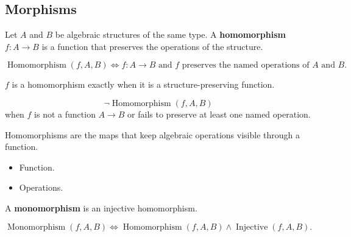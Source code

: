 \subsection{Morphisms}
\label{subsec:morphisms}

\begin{tcolorbox}[title={Definition --- Homomorphism}]
\begin{definition}[Homomorphism]
\label{def:homomorphism}
Let $A$ and $B$ be algebraic structures of the same type.
A \textbf{homomorphism} $f:A\to B$ is a function that preserves the operations
of the structure.
\end{definition}
\end{tcolorbox}

\begin{remark*}
\[
\operatorname{Homomorphism}(f,A,B)
\Longleftrightarrow
f:A\to B
\text{ and } f \text{ preserves the named operations of }A\text{ and }B.
\]
\end{remark*}

\begin{remark*}
$f$ is a homomorphism exactly when it is a structure-preserving function.
\end{remark*}

\begin{remark*}
\[
\neg\operatorname{Homomorphism}(f,A,B)
\]
when $f$ is not a function $A\to B$ or fails to preserve at least one named
operation.
\end{remark*}

\begin{remark*}[Interpretation]
Homomorphisms are the maps that keep algebraic operations visible through a
function.
\end{remark*}

\begin{remark*}[Dependencies]
\begin{itemize}
  \item Function.
  \item Operations.
\end{itemize}
\end{remark*}

\begin{definition}[Monomorphism]
\label{def:monomorphism}
A \textbf{monomorphism} is an injective homomorphism.
\end{definition}

\begin{remark*}
\[
\operatorname{Monomorphism}(f,A,B)
\Longleftrightarrow
\operatorname{Homomorphism}(f,A,B)
\land
\operatorname{Injective}(f,A,B).
\]
\end{remark*}


